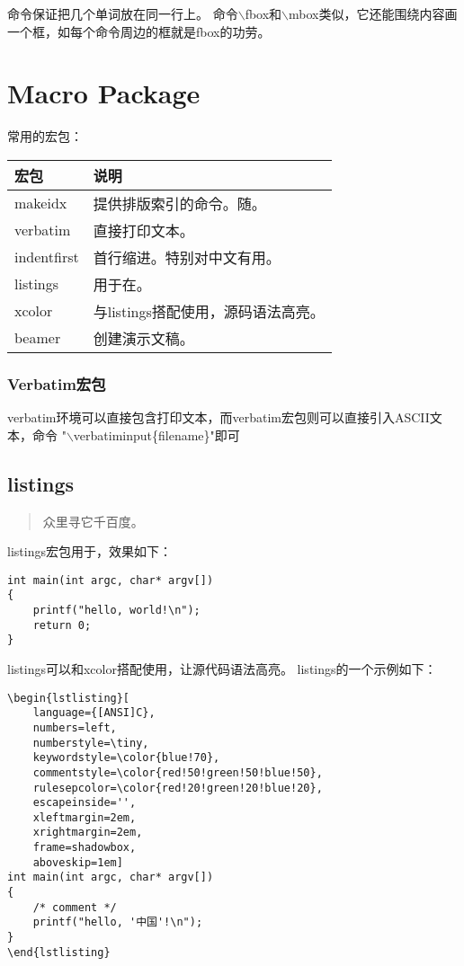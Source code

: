 \documentclass[a4paper,11pt,oneside,openany]{book}
\begin{document}
\begin{CJK*}{GBK}{song}
命令保证把几个单词放在同一行上。
命令$\backslash$fbox和$\backslash$mbox类似，它还能围绕内容画一个框，如每个命令周边的框就是fbox的功劳。


\section{Macro Package}
常用的宏包：\\
\begin{tabular}{|l|l|}
\hline
宏包            & 说明 \\ \hline
makeidx         & 提供排版索引的命令。随。\\ \hline
verbatim        & 直接打印文本。\\ \hline
indentfirst     & 首行缩进。特别对中文有用。 \\ \hline
listings        & 用于在。\\ \hline
xcolor          & 与listings搭配使用，源码语法高亮。 \\ \hline
beamer          & 创建演示文稿。\\\hline
\end{tabular}

\subsubsection{Verbatim宏包}\label{latex-macro-package-verbatim}
verbatim环境可以直接包含打印文本，而verbatim宏包则可以直接引入ASCII文本，命令
"$\backslash$verbatiminput\{filename\}"即可

\subsection{listings}
\begin{quote}
众里寻它千百度。
\end{quote}

listings宏包用于，效果如下：
\begin{lstlisting}
int main(int argc, char* argv[])
{
    printf("hello, world!\n");
    return 0;
}
\end{lstlisting}

listings可以和xcolor搭配使用，让源代码语法高亮。
listings的一个示例如下：
\begin{verbatim}
\begin{lstlisting}[
    language={[ANSI]C},
    numbers=left,
    numberstyle=\tiny,
    keywordstyle=\color{blue!70},
    commentstyle=\color{red!50!green!50!blue!50},
    rulesepcolor=\color{red!20!green!20!blue!20},
    escapeinside='',
    xleftmargin=2em,
    xrightmargin=2em,
    frame=shadowbox,
    aboveskip=1em]
int main(int argc, char* argv[])
{
    /* comment */
    printf("hello, '中国'!\n");
}
\end{lstlisting}
\end{verbatim}


\end{CJK*}
\end{document}
